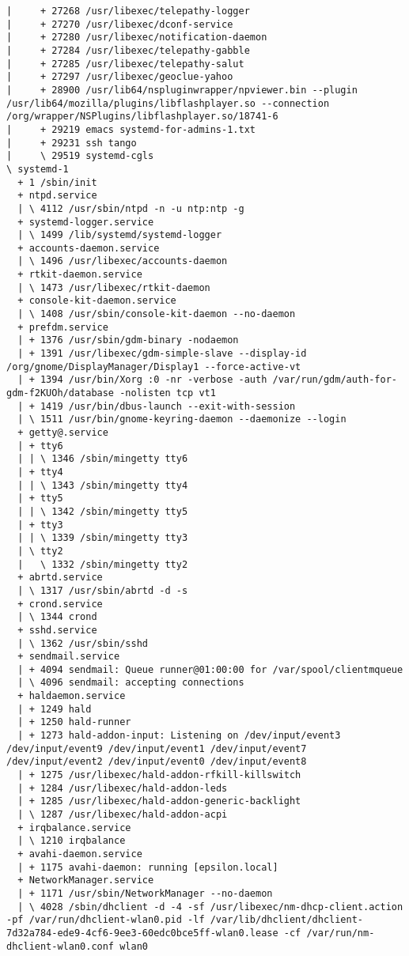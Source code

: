 \documentclass[10pt,oneside,a4paper]{article}
\begin{document}
\begin{landscape}
\begin{Verbatim}[fontsize=\small]
|     + 27268 /usr/libexec/telepathy-logger
|     + 27270 /usr/libexec/dconf-service
|     + 27280 /usr/libexec/notification-daemon
|     + 27284 /usr/libexec/telepathy-gabble
|     + 27285 /usr/libexec/telepathy-salut
|     + 27297 /usr/libexec/geoclue-yahoo
|     + 28900 /usr/lib64/nspluginwrapper/npviewer.bin --plugin /usr/lib64/mozilla/plugins/libflashplayer.so --connection /org/wrapper/NSPlugins/libflashplayer.so/18741-6
|     + 29219 emacs systemd-for-admins-1.txt
|     + 29231 ssh tango
|     \ 29519 systemd-cgls
\ systemd-1
  + 1 /sbin/init
  + ntpd.service
  | \ 4112 /usr/sbin/ntpd -n -u ntp:ntp -g
  + systemd-logger.service
  | \ 1499 /lib/systemd/systemd-logger
  + accounts-daemon.service
  | \ 1496 /usr/libexec/accounts-daemon
  + rtkit-daemon.service
  | \ 1473 /usr/libexec/rtkit-daemon
  + console-kit-daemon.service
  | \ 1408 /usr/sbin/console-kit-daemon --no-daemon
  + prefdm.service
  | + 1376 /usr/sbin/gdm-binary -nodaemon
  | + 1391 /usr/libexec/gdm-simple-slave --display-id /org/gnome/DisplayManager/Display1 --force-active-vt
  | + 1394 /usr/bin/Xorg :0 -nr -verbose -auth /var/run/gdm/auth-for-gdm-f2KUOh/database -nolisten tcp vt1
  | + 1419 /usr/bin/dbus-launch --exit-with-session
  | \ 1511 /usr/bin/gnome-keyring-daemon --daemonize --login
  + getty@.service
  | + tty6
  | | \ 1346 /sbin/mingetty tty6
  | + tty4
  | | \ 1343 /sbin/mingetty tty4
  | + tty5
  | | \ 1342 /sbin/mingetty tty5
  | + tty3
  | | \ 1339 /sbin/mingetty tty3
  | \ tty2
  |   \ 1332 /sbin/mingetty tty2
  + abrtd.service
  | \ 1317 /usr/sbin/abrtd -d -s
  + crond.service
  | \ 1344 crond
  + sshd.service
  | \ 1362 /usr/sbin/sshd
  + sendmail.service
  | + 4094 sendmail: Queue runner@01:00:00 for /var/spool/clientmqueue
  | \ 4096 sendmail: accepting connections
  + haldaemon.service
  | + 1249 hald
  | + 1250 hald-runner
  | + 1273 hald-addon-input: Listening on /dev/input/event3 /dev/input/event9 /dev/input/event1 /dev/input/event7 /dev/input/event2 /dev/input/event0 /dev/input/event8
  | + 1275 /usr/libexec/hald-addon-rfkill-killswitch
  | + 1284 /usr/libexec/hald-addon-leds
  | + 1285 /usr/libexec/hald-addon-generic-backlight
  | \ 1287 /usr/libexec/hald-addon-acpi
  + irqbalance.service
  | \ 1210 irqbalance
  + avahi-daemon.service
  | + 1175 avahi-daemon: running [epsilon.local]
  + NetworkManager.service
  | + 1171 /usr/sbin/NetworkManager --no-daemon
  | \ 4028 /sbin/dhclient -d -4 -sf /usr/libexec/nm-dhcp-client.action -pf /var/run/dhclient-wlan0.pid -lf /var/lib/dhclient/dhclient-7d32a784-ede9-4cf6-9ee3-60edc0bce5ff-wlan0.lease -cf /var/run/nm-dhclient-wlan0.conf wlan0

\end{Verbatim}
\end{landscape}
\end{document}
